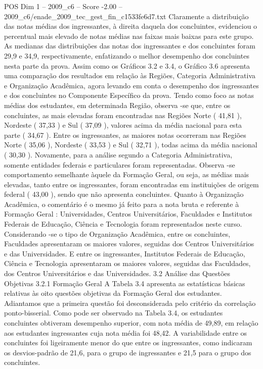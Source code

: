 \begin{textsample}{POS Dim 1 – 2009\_c6 – Score -2.00 – 2009\_c6/enade\_2009\_tec\_gest\_fin\_c1533fe6d7.txt}
Claramente a distribuição das notas médias dos ingressantes, à direita daquela dos concluintes, evidenciou o percentual mais elevado de notas médias nas faixas mais baixas para este grupo.
As medianas das distribuições das notas dos ingressantes e dos concluintes foram 29,9 e 34,9, respectivamente, enfatizando o melhor desempenho dos concluintes nesta parte da prova.
Assim como os Gráficos 3.2 e 3.4, o Gráfico 3.6 apresenta uma comparação dos resultados em relação às Regiões, Categoria Administrativa e Organização Acadêmica, agora levando em conta o desempenho dos ingressantes e dos concluintes no Componente Específico da prova.
Tendo como foco as notas médias dos estudantes, em determinada Região, observa -se que, entre os concluintes, as mais elevadas foram encontradas nas Regiões Norte ( 41,81 ), Nordeste ( 37,33 ) e Sul ( 37,09 ), valores acima da média nacional para esta parte ( 34,67 ).
Entre os ingressantes, as maiores notas ocorreram nas Regiões Norte ( 35,06 ), Nordeste ( 33,53 ) e Sul ( 32,71 ), todas acima da média nacional ( 30,30 ).
Novamente, para a análise segundo a Categoria Administrativa, somente entidades federais e particulares foram representadas.
Observa -se comportamento semelhante àquele da Formação Geral, ou seja, as médias mais elevadas, tanto entre os ingressantes, foram encontradas em instituições de origem federal ( 43,00 ), sendo que não apresenta concluintes.
Quanto à Organização Acadêmica, o comentário é o mesmo já feito para a nota bruta e referente à Formação Geral : Universidades, Centros Universitários, Faculdades e Institutos Federais de Educação, Ciência e Tecnologia foram representados neste curso.
Considerando -se o tipo de Organização Acadêmica, entre os concluintes, Faculdades apresentaram os maiores valores, seguidas dos Centros Universitários e das Universidades.
E entre os ingressantes, Institutos Federais de Educação, Ciência e Tecnologia apresentaram os maiores valores, seguidas das Faculdades, dos Centros Universitários e das Universidades. 3.2 Análise das Questões Objetivas 3.2.1 Formação Geral A Tabela 3.4 apresenta as estatísticas básicas relativas às oito questões objetivas da Formação Geral dos estudantes.
Adiantamos que a primeira questão foi desconsiderada pelo critério da correlação ponto-bisserial.
Como pode ser observado na Tabela 3.4, os estudantes concluintes obtiveram desempenho superior, com nota média de 49,89, em relação aos estudantes ingressantes cuja nota média foi 48,42.
A variabilidade entre os concluintes foi ligeiramente menor do que entre os ingressantes, como indicaram os desvios-padrão de 21,6, para o grupo de ingressantes e 21,5 para o grupo dos concluintes.

\end{textsample}
